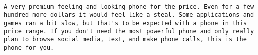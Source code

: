 \documentclass[
  11pt,
]{article}
\begin{document}
\begin{verbatim}
                                                                                                                                                                                                                                                                                                                                                                                                                                                                                                                                                                                                                                                                                                                                                                                                                                                                                                                                            A very premium feeling and looking phone for the price. Even for a few hundred more dollars it would feel like a steal. Some applications and games ran a bit slow, but that's to be expected with a phone in this price range. If you don't need the most powerful phone and only really plan to browse social media, text, and make phone calls, this is the phone for you.

\end{verbatim}
\end{document}
